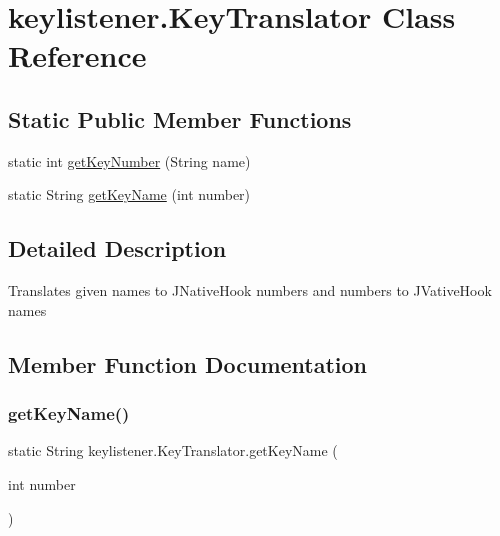 \hypertarget{classkeylistener_1_1_key_translator}{}\section{keylistener.\+Key\+Translator Class Reference}
\label{classkeylistener_1_1_key_translator}
\subsection*{Static Public Member Functions}
\begin{DoxyCompactItemize}
\item 
static int \hyperlink{classkeylistener_1_1_key_translator_abd2332b9ec51409f5ef9fe9d0e593f96}{get\+Key\+Number} (String name)
\item 
static String \hyperlink{classkeylistener_1_1_key_translator_aed127207c6e39e97998e4b2783e258c5}{get\+Key\+Name} (int number)
\end{DoxyCompactItemize}


\subsection{Detailed Description}
Translates given names to J\+Native\+Hook numbers and numbers to J\+Vative\+Hook names 

\subsection{Member Function Documentation}
\mbox{\label{classkeylistener_1_1_key_translator_aed127207c6e39e97998e4b2783e258c5}} 
\subsubsection{\texorpdfstring{get\+Key\+Name()}{getKeyName()}}
{\footnotesize\ttfamily static String keylistener.\+Key\+Translator.\+get\+Key\+Name (\begin{DoxyParamCaption}\item[{int}]{number }\end{DoxyParamCaption})\hspace{0.3cm}{\ttfamily [static]}}


